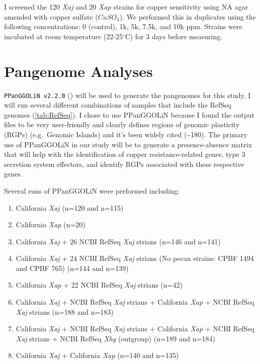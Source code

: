 \documentclass[
]{book}
\providecommand{\tightlist}{%
  \setlength{\itemsep}{0pt}\setlength{\parskip}{0pt}}
\begin{document}
I screened the 120 \emph{Xaj} and 20 \emph{Xap} strains for copper sensitivity using NA agar amended with copper sulfate (\(CuSO_4\)). We performed this in duplicates using the following concentrations: 0 (control), 1k, 5k, 7.5k, and 10k ppm. Strains were incubated at room temperature (22-25\(^\circ\)C) for 3 days before measuring.

\section{Pangenome Analyses}\label{pangenome-analyses}

\texttt{PPanGGOLiN\ v2.2.0} (\citet{Gautreau2020}) will be used to generate the pangenomes for this study. I will run several different combinations of samples that include the RefSeq genomes (\ref{tab:RefSeq}). I chose to use PPanGGOLiN because I found the output files to be very user-friendly and clearly defines regions of genomic plasticity (RGPs) (e.g.~Genomic Islands) and it's been widely cited (\textasciitilde180). The primary use of PPanGGOLiN in our study will be to generate a presence-absence matrix that will help with the identification of copper resistance-related genes, type 3 secretion system effectors, and identify RGPs associated with these respective genes.

Several runs of PPanGGOLiN were performed including:

\begin{enumerate}
\def\labelenumi{\arabic{enumi}.}
\tightlist
\item
  California \emph{Xaj} (n=120 and n=115)
\item
  California \emph{Xap} (n=20)
\item
  California \emph{Xaj} + 26 NCBI RefSeq \emph{Xaj} strians (n=146 and n=141)
\item
  California \emph{Xaj} + 24 NCBI RefSeq \emph{Xaj} strians (No pecan strains: CPBF 1494 and CPBF 765) (n=144 and n=139)
\item
  California \emph{Xap} + 22 NCBI RefSeq \emph{Xaj} strians (n=42)
\item
  California \emph{Xaj} + NCBI RefSeq \emph{Xaj} strians + California \emph{Xap} + NCBI RefSeq \emph{Xaj} strians (n=188 and n=183)
\item
  California \emph{Xaj} + NCBI RefSeq \emph{Xaj} strians + California \emph{Xap} + NCBI RefSeq \emph{Xaj} strians + NCBI RefSeq \emph{Xhg} (outgroup) (n=189 and n=184)
\item
  California \emph{Xaj} + California \emph{Xap} (n=140 and n=135)
\end{enumerate}
\end{document}
